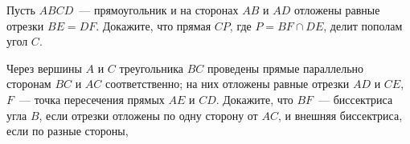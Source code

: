 \documentclass{article}
\begin{document}
\begin{enumerate_boxed}
        \item Пусть $ABCD$~--- прямоугольник и на сторонах $AB$ и $AD$ отложены равные отрезки $BE = DF$.
        Докажите, что прямая $CP$, где $P = BF \cap DE$, делит пополам угол $C$.

        \item Через вершины $A$ и $C$ треугольника $BC$ проведены прямые параллельно сторонам $BC$ и $AC$ соответственно; на них отложены равные отрезки $AD$ и $CE$, $F$~--- точка пересечения прямых $AE$ и $CD$.
        Докажите, что $BF$~--- биссектриса угла $B$, если отрезки отложены по одну сторону от $AC$, и внешняя биссектриса, если по разные стороны,
    \end{enumerate_boxed}
\end{document}

